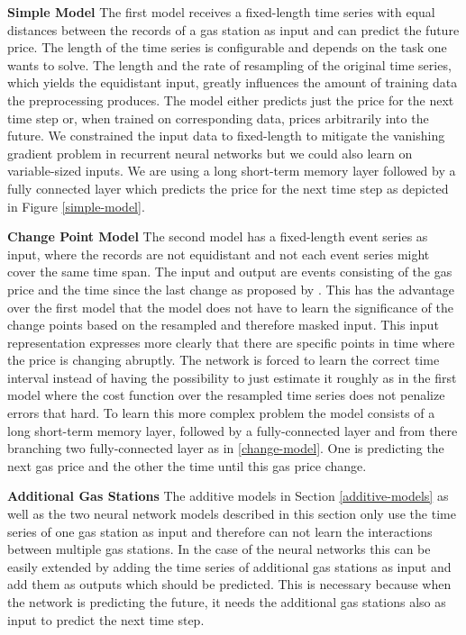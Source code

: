 \documentclass[%
a4paper,
DIV12,
2.5headlines,
bigheadings,
titlepage,
openbib,
]{scrartcl}
\begin{document}


\textbf{Simple Model} The first model receives a fixed-length time series with equal distances between the records of a gas station as input and can predict the future price.
The length of the time series is configurable and depends on the task one wants to solve.
The length and the rate of resampling of the original time series, which yields the equidistant input, greatly influences the amount of training data the preprocessing produces.
The model either predicts just the price for the next time step or, when trained on corresponding data, prices arbitrarily into the future.
We constrained the input data to fixed-length to mitigate the vanishing gradient problem in recurrent neural networks but we could also learn on variable-sized inputs.
We are using a long short-term memory layer followed by a fully connected layer which predicts the price for the next time step as depicted in Figure \ref{simple-model}.

\textbf{Change Point Model} The second model has a fixed-length event series as input, where the records are not equidistant and not each event series might cover the same time span.
The input and output are events consisting of the gas price and the time since the last change as proposed by \citet{du2016recurrent}.
This has the advantage over the first model that the model does not have to learn the significance of the change points based on the resampled and therefore masked input.
This input representation expresses more clearly that there are specific points in time where the price is changing abruptly. 
The network is forced to learn the correct time interval instead of having the possibility to just estimate it roughly as in the first model where the cost function over the resampled time series does not penalize errors that hard.
To learn this more complex problem the model consists of a long short-term memory layer, followed by a fully-connected layer and from there branching two fully-connected layer as in \ref{change-model}. One is predicting the next gas price and the other the time until this gas price change.

\textbf{Additional Gas Stations} The additive models in Section \ref{additive-models} as well as the two neural network models described in this section only use the time series of one gas station as input and therefore can not learn the interactions between multiple gas stations.
In the case of the neural networks this can be easily extended by adding the time series of additional gas stations as input and add them as outputs which should be predicted.
This is necessary because when the network is predicting the future, it needs the additional gas stations also as input to predict the next time step.
\end{document}
